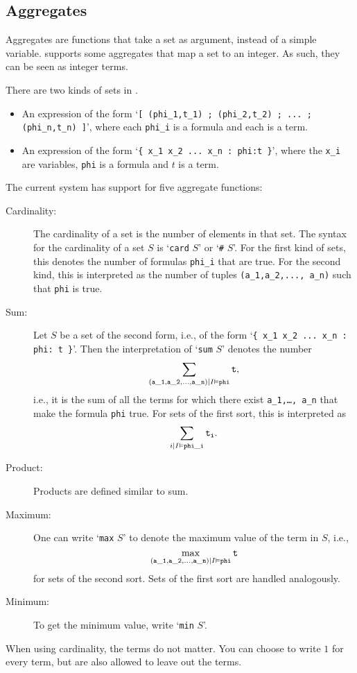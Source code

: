 \documentclass[a4]{article}
\begin{document}
\subsection{Aggregates}
Aggregates are functions that take a set as argument, instead of a simple variable. \idp supports some aggregates that map a set to an integer. As such, they can be seen as integer terms.

There are two kinds of sets in \idp. 
\begin{itemize}
	\item An expression of the form `{\tt [ (phi\_1,t\_1) ; (phi\_2,t\_2) ; ... ; (phi\_n,t\_n) ]}', where each {\tt phi\_i} is a formula and each  is a term.  %
	\item An expression of the form `{\tt \{ x\_1 x\_2 ... x\_n : phi:t \}}', where the {\tt x\_i} are variables, {\tt phi} is a formula and $t$ is a term.  %
\end{itemize} 
The current system has support for five aggregate functions:
\begin{description}
	\item[Cardinality:] The cardinality of a set is the number of elements in that set. The \idp syntax for the cardinality of a set $S$ is `{\tt card} $S$' or `{\tt \#} $S$'. For the first kind of sets, this denotes the number of formulas {\tt phi\_i} that are true.  For the second kind, this is interpreted as the number of tuples {\tt(a\_1,a\_2,..., a\_n)} such that {\tt phi} is true.
	\item[Sum:] Let $S$ be a set of the second form, i.e., of the form `{\tt \{ x\_1 x\_2 ... x\_n : phi: t \}}'. Then the interpretation of `{\tt sum} $S$' denotes the number
	\[ \sum_{{\tt(a\_1,a\_2,..., a\_n)} | I\vDash {\tt phi}} {\tt t }, \]
	i.e., it is the sum of all the terms for which there exist {\tt a\_1,\ldots, a\_n} that make the formula {\tt phi} true. For sets of the first sort, this is interpreted as 
\[ \sum_{i | I\vDash {\tt phi\_i}} {\tt t_i }. \]
	\item[Product:] Products are defined similar to sum.  
	\item[Maximum:] One can write `{\tt max} $S$' to denote the maximum value of the term in $S$, i.e.,
	\[ \max_{{\tt(a\_1,a\_2,..., a\_n)} | I\vDash {\tt phi}} {\tt t} \] for sets of the second sort.  Sets of the first sort are handled analogously. %
	\item[Minimum:] To get the minimum value, write `{\tt min} $S$'.
\end{description}
When using cardinality, the terms do not matter.  You can choose to write $1$ for every term, but are also allowed to leave out the terms.
\end{document}
